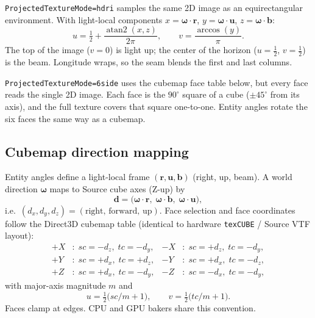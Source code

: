 \documentclass[11pt,a4paper]{article}
\newcommand{\code}[1]{\texttt{#1}}
\newcommand{\vect}[1]{\bm{#1}}
\begin{document}
\code{ProjectedTextureMode=hdri} samples the same 2D image as an
equirectangular environment. With light-local components
$x=\vect{\omega}\cdot\vect{r}$, $y=\vect{\omega}\cdot\vect{u}$,
$z=\vect{\omega}\cdot\vect{b}$:
\begin{equation}
  u=\tfrac12+\frac{\operatorname{atan2}(x,z)}{2\pi},
  \qquad
  v=\frac{\arccos(y)}{\pi}.
\end{equation}
The top of the image ($v=0$) is light up; the center of the horizon
($u=\tfrac12$, $v=\tfrac12$) is the beam. Longitude wraps, so the seam
blends the first and last columns.

\code{ProjectedTextureMode=6side} uses the cubemap face table below, but every
face reads the single 2D image. Each face is the $90^{\circ}$ square of a
cube ($\pm 45^{\circ}$ from its axis), and the full texture covers that square
one-to-one. Entity angles rotate the six faces the same way as a cubemap.

\subsection{Cubemap direction mapping}
\label{sec:cubemap}

Entity angles define a light-local frame $(\vect{r},\vect{u},\vect{b})$
(right, up, beam). A world direction $\vect{\omega}$ maps to Source cube axes
(Z-up) by
\begin{equation}
  \vect{d}
  =
  \bigl(
    \vect{\omega}\cdot\vect{r},\;
    \vect{\omega}\cdot\vect{b},\;
    \vect{\omega}\cdot\vect{u}
  \bigr),
\end{equation}
i.e.\ $(d_x,d_y,d_z)=(\mathrm{right},\,\mathrm{forward},\,\mathrm{up})$.
Face selection and face coordinates follow the Direct3D cubemap table
(identical to hardware \code{texCUBE} / Source VTF layout):
\begin{equation}
\begin{aligned}
  +X&:\; sc=-d_z,\; tc=-d_y, &
  -X&:\; sc=+d_z,\; tc=-d_y, \\
  +Y&:\; sc=+d_x,\; tc=+d_z, &
  -Y&:\; sc=+d_x,\; tc=-d_z, \\
  +Z&:\; sc=+d_x,\; tc=-d_y, &
  -Z&:\; sc=-d_x,\; tc=-d_y,
\end{aligned}
\end{equation}
with major-axis magnitude $m$ and
\begin{equation}
  u=\tfrac12\bigl(sc/m+1\bigr),
  \qquad
  v=\tfrac12\bigl(tc/m+1\bigr).
\end{equation}
Faces clamp at edges. CPU and GPU bakers share this convention.
\end{document}
